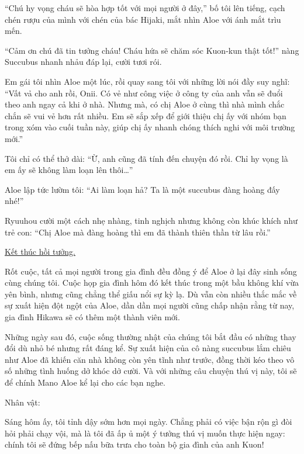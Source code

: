 \documentclass[../main.tex]{subfiles}
\begin{document}
``Chú hy vọng cháu sẽ hòa hợp tốt với mọi người ở đây,'' bố tôi lên tiếng, cạch chén rượu của mình với chén của bác Hijaki, mắt nhìn Aloe với ánh mắt trìu mến.

``Cảm ơn chú đã tin tưởng cháu! Cháu hứa sẽ chăm sóc Kuon-kun thật tốt!'' nàng Succubus nhanh nhảu đáp lại, cười tươi rói.

Em gái tôi nhìn Aloe một lúc, rồi quay sang tôi với những lời nói đầy suy nghĩ: ``Vất vả cho anh rồi, Onii. Có vẻ như công việc ở công ty của anh vẫn sẽ đuổi theo anh ngay cả khi ở nhà. Nhưng mà, có chị Aloe ở cùng thì nhà mình chắc chắn sẽ vui vẻ hơn rất nhiều. Em sẽ sắp xếp để giới thiệu chị ấy với nhóm bạn trong xóm vào cuối tuần này, giúp chị ấy nhanh chóng thích nghi với môi trường mới.''

Tôi chỉ có thể thở dài: ``Ừ, anh cũng đã tính đến chuyện đó rồi. Chỉ hy vọng là em ấy sẽ không làm loạn lên thôi\dots''

Aloe lập tức lườm tôi: ``Ai làm loạn hả? Ta là một succubus đàng hoàng đấy nhé!''

Ryuuhou cười một cách nhẹ nhàng, tinh nghịch nhưng không còn khúc khích như trẻ con: ``Chị Aloe mà đàng hoàng thì em đã thành thiên thần từ lâu rồi.''

\begin{center}
\uline{Kết thúc hồi tưởng.}
\end{center}

Rốt cuộc, tất cả mọi người trong gia đình đều đồng ý để Aloe ở lại đây sinh sống cùng chúng tôi. Cuộc họp gia đình hôm đó kết thúc trong một bầu không khí vừa yên bình, nhưng cũng chẳng thể giấu nổi sự kỳ lạ. Dù vẫn còn nhiều thắc mắc về sự xuất hiện đột ngột của Aloe, dần dần mọi người cũng chấp nhận rằng từ nay, gia đình Hikawa sẽ có thêm một thành viên mới.

Những ngày sau đó, cuộc sống thường nhật của chúng tôi bắt đầu có những thay đổi dù nhỏ bé nhưng rất đáng kể. Sự xuất hiện của cô nàng succubus lắm chiêu như Aloe đã khiến căn nhà không còn yên tĩnh như trước, đồng thời kéo theo vô số những tình huống dở khóc dở cười. Và với những câu chuyện thú vị này, tôi sẽ để chính Mano Aloe kể lại cho các bạn nghe.


\begin{center}
{\caviar\fontsize{12pt}{12pt}\selectfont Nhân vật:   }
\end{center}

Sáng hôm ấy, tôi tỉnh dậy sớm hơn mọi ngày. Chẳng phải có việc bận rộn gì đòi hỏi phải chạy vội, mà là tôi đã ấp ủ một ý tưởng thú vị muốn thực hiện ngay: chính tôi sẽ đứng bếp nấu bữa trưa cho toàn bộ gia đình của anh Kuon!
\end{document}
